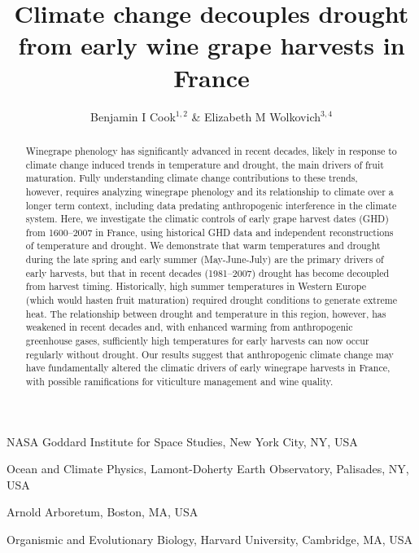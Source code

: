 \documentclass[final]{nature}
\title{Climate change decouples drought from early wine grape harvests in France}
\author{Benjamin I Cook$^{1,2}$ \& Elizabeth M Wolkovich$^{3,4}$}
\begin{document}
\maketitle

\begin{affiliations}
 \item NASA Goddard Institute for Space Studies, New York City, NY, USA
 \item Ocean and Climate Physics, Lamont-Doherty Earth Observatory, Palisades, NY, USA
 \item Arnold Arboretum, Boston, MA, USA
 \item Organismic and Evolutionary Biology, Harvard University, Cambridge, MA, USA
\end{affiliations}

\begin{abstract}
Winegrape phenology has significantly advanced in recent decades\cite{Duchene:2005bd,Seguin2005,webb2011}, likely in response to climate change induced trends in temperature and drought, the main drivers of fruit maturation. Fully understanding climate change contributions to these trends, however, requires analyzing winegrape phenology and its relationship to climate over a longer term context, including data predating anthropogenic interference in the climate system. Here, we investigate the climatic controls of early grape harvest dates (GHD) from 1600--2007 in France, using historical GHD data\cite{Daux2012} and independent reconstructions of temperature\cite{Luterbacher2004} and drought\cite{CookOWDA2015,Pauling2006}. We demonstrate that warm temperatures and drought during the late spring and early summer (May-June-July) are the primary drivers of early harvests, but that in recent decades (1981--2007) drought has become decoupled from harvest timing. Historically, high summer temperatures in Western Europe (which would hasten fruit maturation) required drought conditions to generate extreme heat. The relationship between drought and temperature in this region, however, has weakened in recent decades and, with enhanced warming from anthropogenic greenhouse gases, sufficiently high temperatures for early harvests can now occur regularly without drought. Our results suggest that anthropogenic climate change may have fundamentally altered the climatic drivers of early winegrape harvests in France, with possible ramifications for viticulture management and wine quality. 
\end{abstract}
\end{document}
